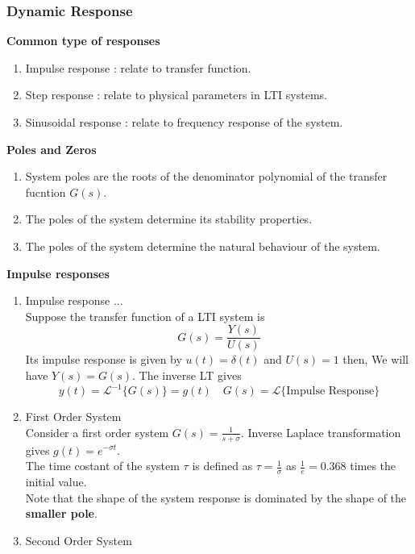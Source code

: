 \documentclass{article}
\begin{document}
\subsubsection{Dynamic Response}
\textbf{Common type of responses}
\begin{enumerate}
    \item Impulse response :  relate to transfer function.
    \item Step response : relate to physical parameters in LTI systems.
    \item Sinusoidal response : relate to frequency response of the system.
\end{enumerate}
\textbf{Poles and Zeros}
\begin{enumerate}
    \item System poles are the roots of the denominator polynomial of the transfer fucntion $G(s)$.
    \item The poles of the system determine its stability properties.
    \item The poles of the system determine the natural behaviour of the system.
\end{enumerate}
\textbf{Impulse responses}
\begin{enumerate}
    \item Impulse response ... \\
    Suppose the transfer function of a LTI system is
    \[G(s) = \frac{Y(s)}{U(s)}\]
    Its impulse response is given by $u(t) = \delta(t)$ and $U(s) = 1$ then, We will have $Y(s) = G(s)$. The inverse LT gives 
    \[y(t) = \mathscr{L}^{-1}\{G(s)\}=g(t) \quad G(s) = \mathscr{L}\{\text{Impulse Response}\}\]
    \item First Order System \\
    Consider a first order system $\displaystyle G(s) = \frac{1}{s+\sigma}$. Inverse Laplace transformation gives $g(t) = e^{-\sigma t}$. \\
    The time costant of the system $\tau$ is defined as $\displaystyle \tau = \frac{1}{\sigma}$ as $\displaystyle \frac{1}{e} = 0.368$ times the initial value. \\
    Note that the shape of the system response is dominated by the shape of the \textbf{smaller pole}.
    \item Second Order System \\

\end{enumerate}




    
\end{document}
